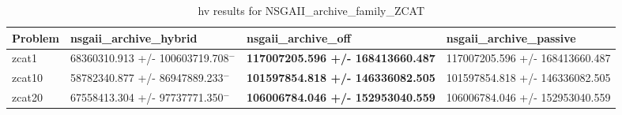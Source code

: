 \begin{table}
\caption{hv results for NSGAII_archive_family_ZCAT}
\label{NSGAII_archive_family_ZCAT_hv}
\begin{tabular}{llll}
\toprule
Problem & nsgaii_archive_hybrid & nsgaii_archive_off & nsgaii_archive_passive \\
\midrule
zcat1 & 68360310.913 +/- 100603719.708$^{-}$ & \textbf{117007205.596 +/- 168413660.487} & 117007205.596 +/- 168413660.487 \\
zcat10 & 58782340.877 +/- 86947889.233$^{-}$ & \textbf{101597854.818 +/- 146336082.505} & 101597854.818 +/- 146336082.505 \\
zcat20 & 67558413.304 +/- 97737771.350$^{-}$ & \textbf{106006784.046 +/- 152953040.559} & 106006784.046 +/- 152953040.559 \\
\bottomrule
\end{tabular}
\end{table}
